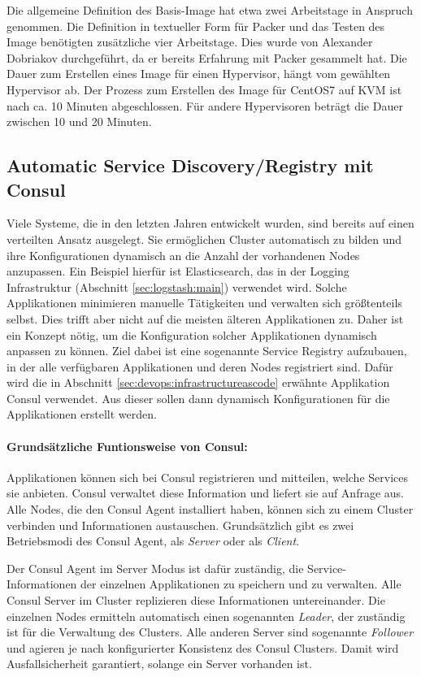Die allgemeine Definition des Basis-Image hat etwa zwei Arbeitstage in Anspruch genommen. Die Definition in textueller Form für Packer und das Testen des Image benötigten zusätzliche vier Arbeitstage. Dies wurde von Alexander Dobriakov durchgeführt, da er bereits Erfahrung mit Packer gesammelt hat. Die Dauer zum Erstellen eines Image für einen Hypervisor, hängt vom gewählten Hypervisor ab. Der Prozess zum Erstellen des Image für CentOS7 auf KVM ist nach ca. 10 Minuten abgeschlossen. Für andere Hypervisoren beträgt die Dauer zwischen 10 und 20 Minuten.

\subsection{Automatic Service Discovery/Registry mit Consul}
\label{sec:consul}
Viele Systeme, die in den letzten Jahren entwickelt wurden, sind bereits auf einen verteilten Ansatz ausgelegt. Sie ermöglichen Cluster automatisch zu bilden und ihre Konfigurationen dynamisch an die Anzahl der vorhandenen Nodes anzupassen. Ein Beispiel hierfür ist Elasticsearch, das in der Logging Infrastruktur (Abschnitt \ref{sec:logstash:main}) verwendet wird. Solche Applikationen minimieren manuelle Tätigkeiten und verwalten sich größtenteils selbst. Dies trifft aber nicht auf die meisten älteren Applikationen zu. Daher ist ein Konzept nötig, um die Konfiguration solcher Applikationen dynamisch anpassen zu können. Ziel dabei ist eine sogenannte Service Registry aufzubauen, in der alle verfügbaren Applikationen und deren Nodes registriert sind. Dafür wird die in Abschnitt \ref{sec:devops:infrastructureascode} erwähnte Applikation Consul verwendet. Aus dieser sollen dann dynamisch Konfigurationen für die Applikationen erstellt werden. 

\paragraph{Grundsätzliche Funtionsweise von Consul:}
Applikationen können sich bei Consul registrieren und mitteilen, welche Services sie anbieten. Consul verwaltet diese Information und liefert sie auf Anfrage aus. Alle Nodes, die den Consul Agent installiert haben, können sich zu einem Cluster verbinden und Informationen austauschen. Grundsätzlich gibt es zwei Betriebsmodi des Consul Agent, als \textit{Server} oder als \textit{Client}. 

Der Consul Agent im Server Modus ist dafür zuständig, die Service-Informationen der einzelnen Applikationen zu speichern und zu verwalten. Alle Consul Server im Cluster replizieren diese Informationen untereinander. Die einzelnen Nodes ermitteln automatisch einen sogenannten \textit{Leader}, der zuständig ist für die Verwaltung des Clusters. Alle anderen Server sind sogenannte \textit{Follower} und agieren je nach konfigurierter Konsistenz des Consul Clusters. Damit wird Ausfallsicherheit garantiert, solange ein Server vorhanden ist. 

